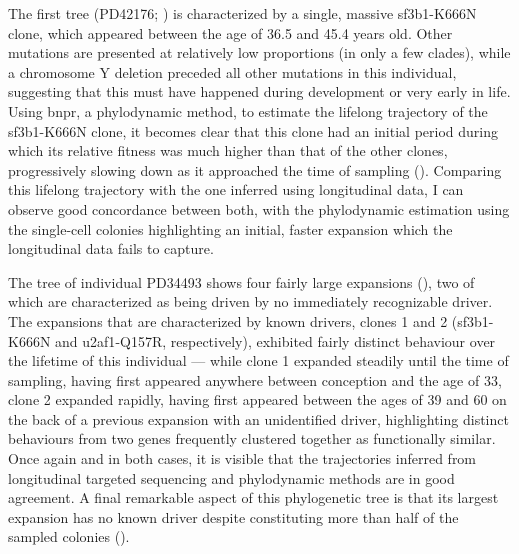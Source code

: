 The first tree (PD42176; ) is characterized by a single, massive \ac{sf3b1}-K666N clone, which appeared between the age of 36.5 and 45.4 years old. Other mutations are presented at relatively low proportions (in only a few clades), while a chromosome Y deletion preceded all other mutations in this individual, suggesting that this must have happened during development or very early in life. Using \ac{bnpr}, a phylodynamic method, to estimate the lifelong trajectory of the \ac{sf3b1}-K666N clone, it becomes clear that this clone had an initial period during which its relative fitness was much higher than that of the other clones, progressively slowing down as it approached the time of sampling (). Comparing this lifelong trajectory with the one inferred using longitudinal data, I can observe good concordance between both, with the phylodynamic estimation using the single-cell colonies highlighting an initial, faster expansion which the longitudinal data fails to capture.

\begin{figure}[!ht]
	\label{fig:tree-pd42176}
\end{figure}

The tree of individual PD34493 shows four fairly large expansions (), two of which are characterized as being driven by no immediately recognizable driver. The expansions that are characterized by known drivers, clones 1 and 2 (\ac{sf3b1}-K666N and \ac{u2af1}-Q157R, respectively), exhibited fairly distinct behaviour over the lifetime of this individual --- while clone 1 expanded steadily until the time of sampling, having first appeared anywhere between conception and the age of 33, clone 2 expanded rapidly, having first appeared between the ages of 39 and 60 on the back of a previous expansion with an unidentified driver, highlighting distinct behaviours from two genes frequently clustered together as functionally similar. Once again and in both cases, it is visible that the trajectories inferred from longitudinal targeted sequencing and phylodynamic methods are in good agreement. A final remarkable aspect of this phylogenetic tree is that its largest expansion has no known driver despite constituting more than half of the sampled colonies (). 

